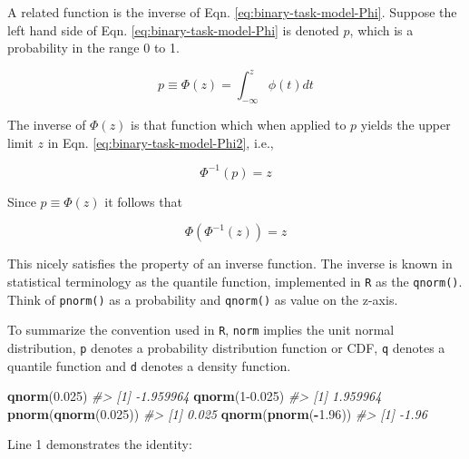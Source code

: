 \documentclass[
]{book}
\newenvironment{Shaded}{\begin{snugshade}}{\end{snugshade}}
\newcommand{\CommentTok}[1]{\textcolor[rgb]{0.56,0.35,0.01}{\textit{#1}}}
\newcommand{\DecValTok}[1]{\textcolor[rgb]{0.00,0.00,0.81}{#1}}
\newcommand{\FloatTok}[1]{\textcolor[rgb]{0.00,0.00,0.81}{#1}}
\newcommand{\KeywordTok}[1]{\textcolor[rgb]{0.13,0.29,0.53}{\textbf{#1}}}
\newcommand{\NormalTok}[1]{#1}
\newcommand{\OperatorTok}[1]{\textcolor[rgb]{0.81,0.36,0.00}{\textbf{#1}}}
\begin{document}
A related function is the inverse of Eqn. \eqref{eq:binary-task-model-Phi}. Suppose the left hand side of Eqn. \eqref{eq:binary-task-model-Phi} is denoted \(p\), which is a probability in the range 0 to 1.

\begin{equation} 
p \equiv \Phi\left ( z \right )=\int_{-\infty }^{z}\phi(t)dt
\label{eq:binary-task-model-Phi2}
\end{equation}

The inverse of \(\Phi(z)\) is that function which when applied to \(p\) yields the upper limit \(z\) in Eqn. \eqref{eq:binary-task-model-Phi2}, i.e.,

\begin{equation} 
\Phi^{-1}(p) = z
\label{eq:binary-task-model-PhiInvDef}
\end{equation}

Since \(p \equiv \Phi(z)\) it follows that

\begin{equation} 
\Phi(\Phi^{-1}(z))=z
\label{eq:binary-task-model-PhiInvDef2}
\end{equation}

This nicely satisfies the property of an inverse function. The inverse is known in statistical terminology as the quantile function, implemented in \texttt{R} as the \texttt{qnorm()}. Think of \texttt{pnorm()} as a probability and \texttt{qnorm()} as value on the z-axis.

To summarize the convention used in \texttt{R}, \texttt{norm} implies the unit normal distribution, \texttt{p} denotes a probability distribution function or CDF, \texttt{q} denotes a quantile function and \texttt{d} denotes a density function.

\begin{Shaded}
\begin{Highlighting}[numbers=left,,]
\KeywordTok{qnorm}\NormalTok{(}\FloatTok{0.025}\NormalTok{)}
\CommentTok{#> [1] -1.959964}
\KeywordTok{qnorm}\NormalTok{(}\DecValTok{1}\FloatTok{-0.025}\NormalTok{)}
\CommentTok{#> [1] 1.959964}
\KeywordTok{pnorm}\NormalTok{(}\KeywordTok{qnorm}\NormalTok{(}\FloatTok{0.025}\NormalTok{))}
\CommentTok{#> [1] 0.025}
\KeywordTok{qnorm}\NormalTok{(}\KeywordTok{pnorm}\NormalTok{(}\OperatorTok{-}\FloatTok{1.96}\NormalTok{))}
\CommentTok{#> [1] -1.96}
\end{Highlighting}
\end{Shaded}

Line 1 demonstrates the identity:
\end{document}
